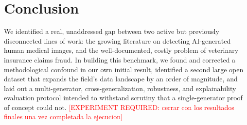 \documentclass[journal]{IEEEtran}
\newcommand{\pending}[1]{\textcolor{red}{[EXPERIMENT REQUIRED: #1]}}
\begin{document}
\section{Conclusion}
\label{sec:conclusion}

We identified a real, unaddressed gap between two active but previously disconnected lines of work: the growing literature on detecting AI-generated human medical images, and the well-documented, costly problem of veterinary insurance claims fraud. In building this benchmark, we found and corrected a methodological confound in our own initial result, identified a second large open dataset that expands the field's data landscape by an order of magnitude, and laid out a multi-generator, cross-generalization, robustness, and explainability evaluation protocol intended to withstand scrutiny that a single-generator proof of concept could not. \pending{cerrar con los resultados finales una vez completada la ejecucion}
\end{document}
